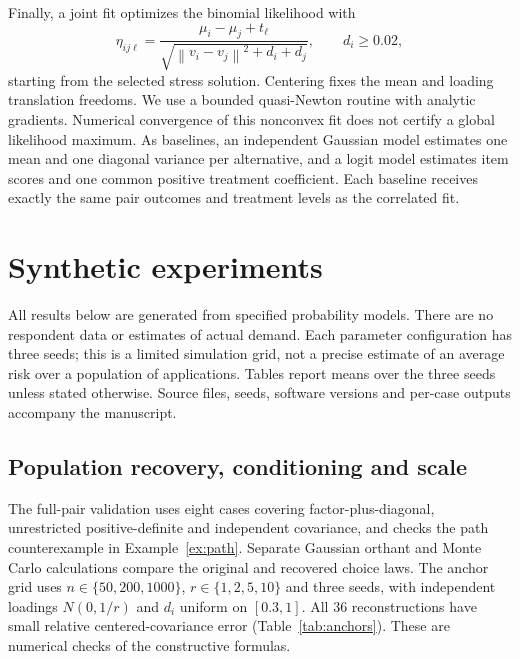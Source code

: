 \documentclass[11pt]{amsart}
\theoremstyle{definition}\newtheorem{example}[theorem]{Example}
\theoremstyle{remark}\newtheorem{remark}[theorem]{Remark}
\newcommand{\norm}[1]{\left\lVert#1\right\rVert}
\begin{document}
Finally, a joint fit optimizes the binomial likelihood with
\[
 \eta_{ij\ell}=\frac{\mu_i-\mu_j+t_\ell}
 {\sqrt{\norm{v_i-v_j}^2+d_i+d_j}},\qquad d_i\geq0.02,
\]
starting from the selected stress solution. Centering fixes the mean and loading translation freedoms. We use a bounded quasi-Newton routine with analytic gradients. Numerical convergence of this nonconvex fit does not certify a global likelihood maximum. As baselines, an independent Gaussian model estimates one mean and one diagonal variance per alternative, and a logit model estimates item scores and one common positive treatment coefficient. Each baseline receives exactly the same pair outcomes and treatment levels as the correlated fit.

\section{Synthetic experiments}\label{sec:experiments}
All results below are generated from specified probability models. There are no respondent data or estimates of actual demand. Each parameter configuration has three seeds; this is a limited simulation grid, not a precise estimate of an average risk over a population of applications. Tables report means over the three seeds unless stated otherwise. Source files, seeds, software versions and per-case outputs accompany the manuscript.

\subsection{Population recovery, conditioning and scale}
The full-pair validation uses eight cases covering factor-plus-diagonal, unrestricted positive-definite and independent covariance, and checks the path counterexample in Example~\ref{ex:path}. Separate Gaussian orthant and Monte Carlo calculations compare the original and recovered choice laws. The anchor grid uses $n\in\{50,200,1000\}$, $r\in\{1,2,5,10\}$ and three seeds, with independent loadings $N(0,1/r)$ and $d_i$ uniform on $[0.3,1]$. All 36 reconstructions have small relative centered-covariance error (Table~\ref{tab:anchors}). These are numerical checks of the constructive formulas.
\begin{table}[htbp]\centering\small

\caption{Noiseless anchor reconstruction. The last column is the maximum of $\norm{\widehat C-C}_F/\norm C_F$ over three seeds. The pair count includes every pair involving the $3(r+1)$ anchors.}\label{tab:anchors}
\end{table}
\end{document}
